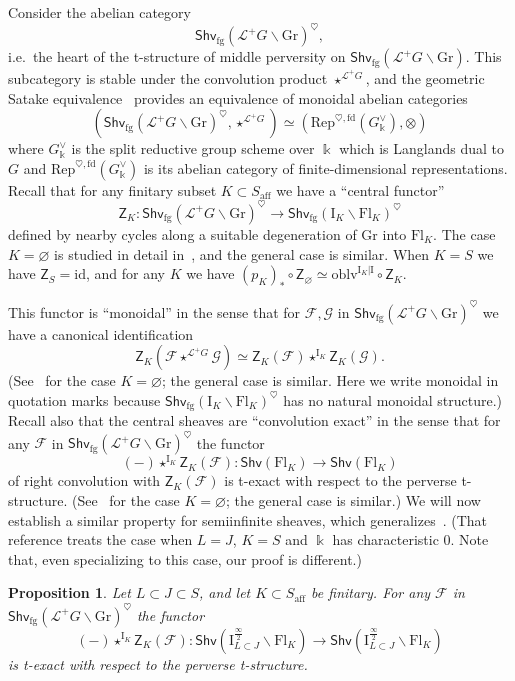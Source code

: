 \documentclass[11pt]{amsart}
\numberwithin{equation}{section}
\theoremstyle{plain}
\newtheorem{prop}[thm]{Proposition}
\theoremstyle{definition}
\newcommand{\sF}{{\mathcal F}}
\newcommand{\sG}{{\mathcal G}}
\newcommand{\I}{{\mathrm I}}
\renewcommand{\k}{\Bbbk}
\newcommand{\sL}{{\mathcal L}}
\newcommand{\id}{\mathrm{id}}
\newcommand{\Rep}{\mathrm{Rep}}
\newcommand{\semi}{{{\frac{\infty}{2}}}}
\newcommand{\oblv}{\mathrm{oblv}}
\newcommand{\af}{\mathrm{aff}}
\newcommand{\Shv}{\mathsf{Shv}}
\newcommand{\Shvfg}{\mathsf{Shv}_{\mathrm{fg}}}
\newcommand{\Fl}{\mathrm{Fl}}
\newcommand{\Gr}{\mathrm{Gr}}
\newcommand{\fd}{\mathrm{fd}}
\newcommand{\ZCen}{\mathsf{Z}}
\begin{document}
Consider the abelian category
\[
\Shvfg(\sL^+G \backslash \Gr)^\heartsuit,
\]
i.e.~the heart of the t-structure of middle perversity on $\Shvfg(\sL^+G \backslash \Gr)$. This subcategory is stable under the convolution product $\star^{\sL^+ G}$, and the geometric Satake equivalence~\cite{mv} provides an equivalence of monoidal abelian categories
\begin{equation}
\label{eqn:geom-Satake}
(\Shvfg(\sL^+G \backslash \Gr)^\heartsuit, \star^{\sL^+ G}) \simeq (\Rep^{\heartsuit,\fd}(G^\vee_\k), \otimes) 
\end{equation}
where $G^\vee_\k$ is the split reductive group scheme over $\k$ which is Langlands dual to $G$ and $\Rep^{\heartsuit,\fd}(G^\vee_\k)$ is its abelian category of finite-dimensional representations.
Recall that for any finitary subset $K \subset S_\af$ we have a ``central functor''
\[
\ZCen_K : \Shvfg(\sL^+G \backslash \Gr)^\heartsuit \to \Shvfg(\I_K \backslash \Fl_K)^\heartsuit
\]
defined by nearby cycles along a suitable degeneration of $\Gr$ into $\Fl_K$. The case $K=\varnothing$ is studied in detail in~\cite{ARbook}, and the general case is similar. When $K=S$ we have $\ZCen_S=\id$, and for any $K$ we have $(p_K)_* \circ \ZCen_\varnothing \simeq \oblv^{\I_K | \I} \circ \ZCen_K$.

This functor is ``monoidal'' in the sense that for $\sF,\sG$ in $\Shvfg(\sL^+G \backslash \Gr)^\heartsuit$ we have a canonical identification
\[
\ZCen_K(\sF \star^{\sL^+G} \sG) \simeq \ZCen_K(\sF) \star^{\I_K} \ZCen_K(\sG).
\]
(See~\cite[Theorem~3.4.1]{ARbook} for the case $K=\varnothing$; the general case is similar. Here we write monoidal in quotation marks because $\Shvfg(\I_K \backslash \Fl_K)^\heartsuit$ has no natural monoidal structure.)
Recall also that the central sheaves are ``convolution exact'' in the sense that for any $\sF$ in $\Shvfg(\sL^+G \backslash \Gr)^\heartsuit$ the functor
\[
(-) \star^{\I_K} \ZCen_K(\sF) : \Shv(\Fl_K) \to \Shv(\Fl_K)
\]
of right convolution with $\ZCen_K(\sF)$
is t-exact with respect to the perverse t-structure. (See~\cite[Corollary~3.2.5]{ARbook} for the case $K=\varnothing$; the general case is similar.) 
We will now establish a similar property for semiinfinite sheaves, which generalizes~\cite[Proposition~3.3.15]{DL23}. (That reference treats the case when $L=J$, $K=S$ and $\k$ has characteristic $0$. Note that, even specializing to this case, our proof is different.)

\begin{prop}
\label{prop:right-conv-t-exact}
Let $L \subset J \subset S$, and let $K \subset S_\af$ be finitary. For any $\sF$ in $\Shvfg(\sL^+G \backslash \Gr)^\heartsuit$ the functor
\[
(-) \star^{\I_K} \ZCen_K(\sF) : \Shv \left( \I_{L \subset J}^\semi \backslash \Fl_K \right) \to \Shv \left( \I_{L \subset J}^\semi \backslash \Fl_K \right)
\]
is t-exact with respect to the perverse t-structure.
\end{prop}
\end{document}
